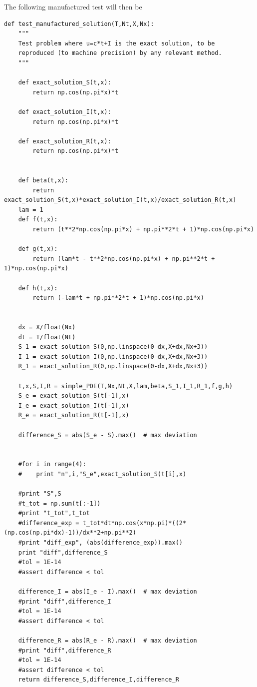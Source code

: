 \documentclass[%
twoside,                 %
final,                   %
10pt]{article}
\begin{document}
The following manufactured test will then be
\begin{Verbatim}[numbers=none,fontsize=\fontsize{9pt}{9pt},baselinestretch=0.95]
def test_manufactured_solution(T,Nt,X,Nx):
    """
    Test problem where u=c*t+I is the exact solution, to be
    reproduced (to machine precision) by any relevant method.
    """
    
    def exact_solution_S(t,x):
        return np.cos(np.pi*x)*t

    def exact_solution_I(t,x):
        return np.cos(np.pi*x)*t

    def exact_solution_R(t,x):
        return np.cos(np.pi*x)*t


    def beta(t,x):
        return exact_solution_S(t,x)*exact_solution_I(t,x)/exact_solution_R(t,x)
    lam = 1
    def f(t,x):
        return (t**2*np.cos(np.pi*x) + np.pi**2*t + 1)*np.cos(np.pi*x) 

    def g(t,x):
        return (lam*t - t**2*np.cos(np.pi*x) + np.pi**2*t + 1)*np.cos(np.pi*x)

    def h(t,x):
        return (-lam*t + np.pi**2*t + 1)*np.cos(np.pi*x)
        

    dx = X/float(Nx)
    dt = T/float(Nt)
    S_1 = exact_solution_S(0,np.linspace(0-dx,X+dx,Nx+3))
    I_1 = exact_solution_I(0,np.linspace(0-dx,X+dx,Nx+3))
    R_1 = exact_solution_R(0,np.linspace(0-dx,X+dx,Nx+3))
     
    t,x,S,I,R = simple_PDE(T,Nx,Nt,X,lam,beta,S_1,I_1,R_1,f,g,h)
    S_e = exact_solution_S(t[-1],x)
    I_e = exact_solution_I(t[-1],x)
    R_e = exact_solution_R(t[-1],x)
    
    difference_S = abs(S_e - S).max()  # max deviation

    
    #for i in range(4):
    #    print "n",i,"S_e",exact_solution_S(t[i],x)
    
    #print "S",S
    #t_tot = np.sum(t[:-1])
    #print "t_tot",t_tot
    #difference_exp = t_tot*dt*np.cos(x*np.pi)*((2*(np.cos(np.pi*dx)-1))/dx**2+np.pi**2)
    #print "diff_exp", (abs(difference_exp)).max()
    print "diff",difference_S
    #tol = 1E-14
    #assert difference < tol
    
    difference_I = abs(I_e - I).max()  # max deviation
    #print "diff",difference_I
    #tol = 1E-14
    #assert difference < tol
   
    difference_R = abs(R_e - R).max()  # max deviation
    #print "diff",difference_R
    #tol = 1E-14
    #assert difference < tol
    return difference_S,difference_I,difference_R
\end{Verbatim}
\end{document}

